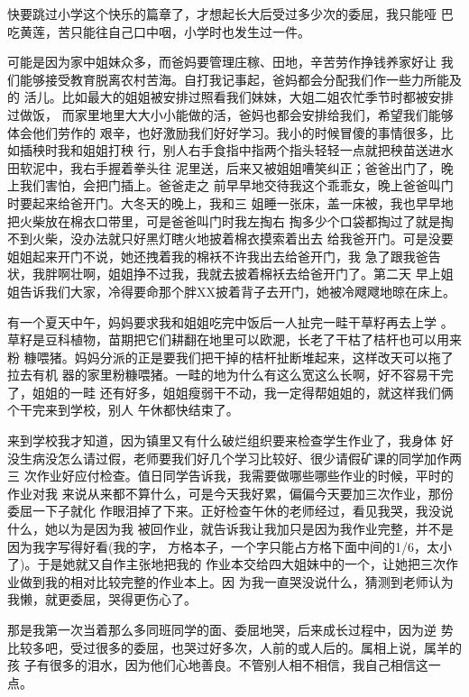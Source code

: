 \documentclass[12pt]{book}
\begin{document}
        快要跳过小学这个快乐的篇章了，才想起长大后受过多少次的委屈，我只能哑
巴吃黄莲，苦只能往自己口中咽，小学时也发生过一件。

        可能是因为家中姐妹众多，而爸妈要管理庄稼、田地，辛苦劳作挣钱养家好让
我们能够接受教育脱离农村苦海。自打我记事起，爸妈都会分配我们作一些力所能及的
活儿。比如最大的姐姐被安排过照看我们妹妹，大姐二姐农忙季节时都被安排过做饭，
而家里地里大大小小能做的活，爸妈也都会安排给我们，希望我们能够体会他们劳作的
艰辛，也好激励我们好好学习。我小的时候冒傻的事情很多，比如插秧时我和姐姐打秧
行，别人右手食指中指两个指头轻轻一点就把秧苗送进水田软泥中，我右手握着拳头往
泥里送，后来又被姐姐嘈笑纠正；爸爸出门了，晚上我们害怕，会把门插上。爸爸走之
前早早地交待我这个乖乖女，晚上爸爸叫门时要起来给爸开门。大冬天的晚上，我和三
姐睡一张床，盖一床被，我也早早地把火柴放在棉衣口带里，可是爸爸叫门时我左掏右
掏多少个口袋都掏过了就是掏不到火柴，没办法就只好黑灯瞎火地披着棉衣摸索着出去
给我爸开门。可是没要姐姐起来开门不说，她还拽着我的棉袄不许我出去给爸开门，我
急了跟我爸告状，我胖啊壮啊，姐姐挣不过我，我就去披着棉袄去给爸开门了。第二天
早上姐姐告诉我们大家，冷得要命那个胖XX披着背子去开门，她被冷飕飕地晾在床上。

        有一个夏天中午，妈妈要求我和姐姐吃完中饭后一人扯完一畦干草籽再去上学
。草籽是豆科植物，苗期把它们耕翻在地里可以欧淝，长老了干枯了桔杆也可以用来粉
糠喂猪。妈妈分派的正是要我们把干掉的桔杆扯断堆起来，这样改天可以拖了拉去有机
器的家里粉糠喂猪。一畦的地为什么有这么宽这么长啊，好不容易干完了，姐姐的一畦
还有好多，姐姐瘦弱干不动，我一定得帮姐姐的，就这样我们俩个干完来到学校，别人
午休都快结束了。

        来到学校我才知道，因为镇里又有什么破烂组织要来检查学生作业了，我身体
好没生病没怎么请过假，老师要我们好几个学习比较好、很少请假矿课的同学加作两三
次作业好应付检查。值日同学告诉我，我需要做哪些哪些作业的时候，平时的作业对我
来说从来都不算什么，可是今天我好累，偏偏今天要加三次作业，那份委屈一下子就化
作眼泪掉了下来。正好检查午休的老师经过，看见我哭，我没说什么，她以为是因为我
被回作业，就告诉我让我加只是因为我作业完整，并不是因为我字写得好看(我的字，
方格本子，一个字只能占方格下面中间的1/6，太小了)。于是她就又自作主张地把我的
作业本交给四大姐妹中的一个，让她把三次作业做到我的相对比较完整的作业本上。因
为我一直哭没说什么，猜测到老师认为我懒，就更委屈，哭得更伤心了。

        那是我第一次当着那么多同班同学的面、委屈地哭，后来成长过程中，因为逆
势比较多吧，受过很多的委屈，也哭过好多次，人前的或人后的。属相上说，属羊的孩
子有很多的泪水，因为他们心地善良。不管别人相不相信，我自己相信这一点。
\end{document}
